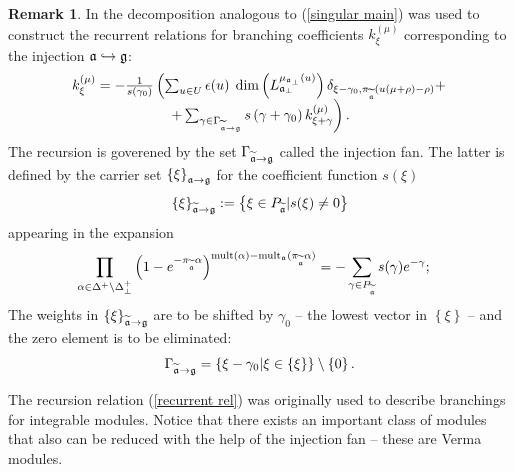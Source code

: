 \documentclass[12pt]{article}
\theoremstyle{definition}
\newtheorem{remark}{Remark}
\begin{document}
\begin{remark}

In \cite
{2010arXiv1007.0318L} the decomposition analogous to (\ref{singular main}) was
used to construct the recurrent relations for branching coefficients $k_{\xi
}^{\left( \mu \right) }$ corresponding to the injection $\frak{a}%
\hookrightarrow \frak{g}$:
\begin{equation}
\begin{array}{c}
k_{\xi }^{\left( \mu \right) }=-\frac{1}{s\left( \gamma _{0}\right) }\left(
\sum_{u\in U}\epsilon (u)\;\dim \left( L_{\frak{a}_{\perp }}^{\mu _{\frak{a}%
_{\perp }}\left( u\right) }\right) \delta _{\xi -\gamma _{0},\pi _{%
\widetilde{\frak{a}}}(u(\mu +\rho )-\rho )}+\right.  \\
\left. +\sum_{\gamma \in \Gamma _{\widetilde{\frak{a}}\rightarrow \frak{g}%
}}s\left( \gamma +\gamma _{0}\right) k_{\xi +\gamma }^{\left( \mu \right)
}\right) .
\end{array}
\label{recurrent rel}
\end{equation}
The recursion is goverened by the set $\Gamma _{\widetilde{\frak{a}}%
\rightarrow \frak{g}}$ called the injection fan. The latter is defined by the
carrier set $\left\{ \xi \right\} _{\frak{a}\rightarrow \frak{g}}$ for the
coefficient function $s(\xi )$
\begin{equation*}
\left\{ \xi \right\} _{\widetilde{\frak{a}}\rightarrow \frak{g}}:=\left\{
\xi \in P_{\widetilde{\frak{a}}}|s(\xi )\neq 0\right\}
\end{equation*}
appearing in the expansion
\begin{equation}
\prod_{\alpha \in \Delta ^{+}\setminus \Delta _{\bot }^{+}}\left( 1-e^{-\pi
_{\widetilde{\frak{a}}}\alpha }\right) ^{\mathrm{mult}(\alpha )-\mathrm{mult}%
_{\frak{a}}(\pi _{\widetilde{\frak{a}}}\alpha )}=-\sum_{\gamma \in P_{%
\widetilde{\frak{a}}}}s(\gamma )e^{-\gamma };\quad
\end{equation}
The weights in $\left\{ \xi \right\} _{\widetilde{\frak{a}}\rightarrow \frak{%
g}}$ are to be shifted by $\gamma _{0}$ -- the lowest vector in $\left\{ \xi
\right\} $ -- and the zero element is to be eliminated:
\begin{equation}
\Gamma _{\widetilde{\frak{a}}\rightarrow \frak{g}}=\left\{ \xi -\gamma
_{0}|\xi \in \left\{ \xi \right\} \right\} \setminus \left\{ 0\right\} .
\end{equation}

The recursion relation (\ref{recurrent rel}) was originally used to
describe branchings for integrable modules. Notice that there exists an
important class of modules that also can be reduced with the help of the
injection fan --
these are Verma modules.
\end{remark}
\end{document}
